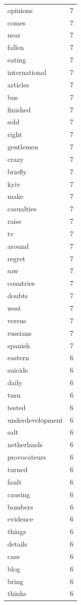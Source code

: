 \begin{tabular}{lr}
opinions & 7 \\
comes & 7 \\
near & 7 \\
fallen & 7 \\
eating & 7 \\
international & 7 \\
articles & 7 \\
bus & 7 \\
finished & 7 \\
sold & 7 \\
right & 7 \\
gentlemen & 7 \\
crazy & 7 \\
briefly & 7 \\
kyiv & 7 \\
make & 7 \\
casualties & 7 \\
raise & 7 \\
tv & 7 \\
around & 7 \\
regret & 7 \\
saw & 7 \\
countries & 7 \\
doubts & 7 \\
west & 7 \\
versus & 7 \\
russians & 7 \\
spanish & 7 \\
eastern & 6 \\
suicide & 6 \\
daily & 6 \\
turn & 6 \\
tested & 6 \\
underdevelopment & 6 \\
salt & 6 \\
netherlands & 6 \\
provocateurs & 6 \\
turned & 6 \\
fault & 6 \\
causing & 6 \\
bombers & 6 \\
evidence & 6 \\
things & 6 \\
details & 6 \\
case & 6 \\
blog & 6 \\
bring & 6 \\
thinks & 6 \\

\end{tabular}
